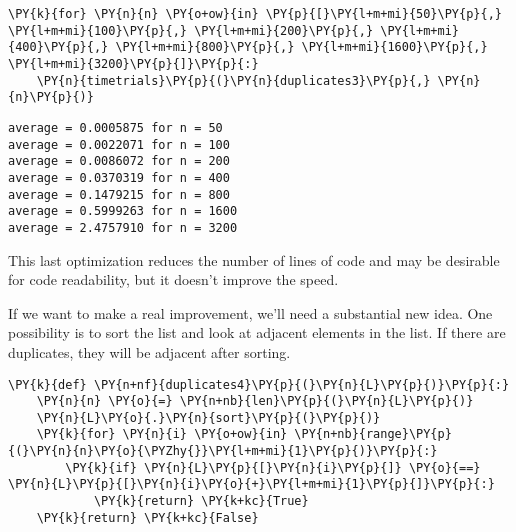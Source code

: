 \begin{Verbatim}[commandchars=\\\{\}]
\PY{k}{for} \PY{n}{n} \PY{o+ow}{in} \PY{p}{[}\PY{l+m+mi}{50}\PY{p}{,} \PY{l+m+mi}{100}\PY{p}{,} \PY{l+m+mi}{200}\PY{p}{,} \PY{l+m+mi}{400}\PY{p}{,} \PY{l+m+mi}{800}\PY{p}{,} \PY{l+m+mi}{1600}\PY{p}{,} \PY{l+m+mi}{3200}\PY{p}{]}\PY{p}{:}
    \PY{n}{timetrials}\PY{p}{(}\PY{n}{duplicates3}\PY{p}{,} \PY{n}{n}\PY{p}{)}
\end{Verbatim}

\begin{Verbatim}
average = 0.0005875 for n = 50
average = 0.0022071 for n = 100
average = 0.0086072 for n = 200
average = 0.0370319 for n = 400
average = 0.1479215 for n = 800
average = 0.5999263 for n = 1600
average = 2.4757910 for n = 3200
\end{Verbatim}


This last optimization reduces the number of lines of code and may be desirable for code readability, but it doesn't improve the speed.


If we want to make a real improvement, we'll need a substantial new idea.
One possibility is to sort the list and look at adjacent elements in the list.
If there are duplicates, they will be adjacent after sorting.

\begin{Verbatim}[commandchars=\\\{\}]
\PY{k}{def} \PY{n+nf}{duplicates4}\PY{p}{(}\PY{n}{L}\PY{p}{)}\PY{p}{:}
    \PY{n}{n} \PY{o}{=} \PY{n+nb}{len}\PY{p}{(}\PY{n}{L}\PY{p}{)}
    \PY{n}{L}\PY{o}{.}\PY{n}{sort}\PY{p}{(}\PY{p}{)}
    \PY{k}{for} \PY{n}{i} \PY{o+ow}{in} \PY{n+nb}{range}\PY{p}{(}\PY{n}{n}\PY{o}{\PYZhy{}}\PY{l+m+mi}{1}\PY{p}{)}\PY{p}{:}
        \PY{k}{if} \PY{n}{L}\PY{p}{[}\PY{n}{i}\PY{p}{]} \PY{o}{==} \PY{n}{L}\PY{p}{[}\PY{n}{i}\PY{o}{+}\PY{l+m+mi}{1}\PY{p}{]}\PY{p}{:}
            \PY{k}{return} \PY{k+kc}{True}
    \PY{k}{return} \PY{k+kc}{False}
\end{Verbatim}


